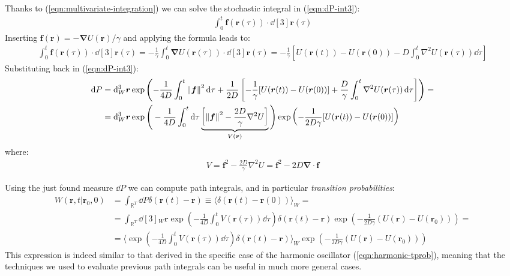 \documentclass[../template.tex]{subfiles}
\begin{document}
 Thanks to (\ref{eqn:multivariate-integration}) we can solve the stochastic integral in (\ref{eqn:dP-int3}):
 \begin{align*}
     \int_0^t \bm{f}(\bm{r}(\tau)) \cdot \dd[3]{\bm{r}(\tau)}
 \end{align*}
 Inserting $\bm{f}(\bm{r}) = -\bm{\nabla} U(\bm{r})/\gamma$ and applying the formula leads to:
 \begin{align*}
     \int_0^t \bm{f}(\bm{r}(\tau)) \cdot \dd[3]{\bm{r}(\tau)} = -\frac{1}{\gamma} \int_0^t \bm{\nabla} U(\bm{r}(\tau)) \cdot \dd[3]{\bm{r}(\tau)}  = -\frac{1}{\gamma} \left[U(\bm{r}(t)) - U(\bm{r}(0)) - D \int_0^t \nabla^2 U(\bm{r}(\tau)) \dd{\tau}\right] 
 \end{align*} 
 Substituting back in (\ref{eqn:dP-int3}):
\begin{align*}
    \dd{P} &= \dd[3]{_W \bm{r}} \exp\left(-\frac{1}{4D} \int_0^t \norm{\bm{f}}^2 \dd{\tau} + \frac{1}{2D} \left[-\frac{1}{\gamma} [U(\bm{r}(t)) - U(\bm{r}(0))] + \frac{D}{\gamma} \int_0^t \nabla^2 U(\bm{r}(\tau)) \dd{\tau} \right]  \right) =\\
    &= \dd[3]{_W \bm{r}} \exp \Bigg(-\frac{1}{4D} \int_0^t \dd{\tau} \underbrace{\left[\norm{\bm{f}}^2 - \frac{2D}{\gamma} \nabla^2 U \right]}_{V(\bm{r})}  \Bigg) \exp\left(-\frac{1}{2 D \gamma} [U(\bm{r}(t)) - U(\bm{r}(0))] \right)
\end{align*}
where:
 \begin{align*}
     V= \bm{f}^2 - \frac{2D}{\gamma}  \nabla^2 U = \bm{f}^2 - 2D \bm{\nabla} \cdot \bm{f}
 \end{align*}
 
Using the just found measure $\dd{P}$ we can compute path integrals, and in particular \textit{transition probabilities}: 
 \begin{align*}
     W(\bm{r},t | \bm{r}_0, 0) &= \int_{\mathbb{R}^T} \dd{P} \delta(\bm{r}(t) - \bm{r}) \equiv \langle \delta(\bm{r}(t)- \bm{r}(0)) \rangle_W = \\
     &= \int_{\mathbb{R}^T} \dd[3]{_W \bm{r}} \exp\left(-\frac{1}{4D} \int_0^t V(\bm{r}(\tau)) \dd{\tau} \right) \delta(\bm{r}(t) - \bm{r}) \exp\left(-\frac{1}{2D \gamma} (U(\bm{r}) - U(\bm{r}_0))\right) =\\
     &= \langle \exp\left(-\frac{1}{4D} \int_0^t V(\bm{r}(\tau)) \dd{\tau} \right)  \delta (\bm{r}(t) - \bm{r})\rangle_W \exp\left(-\frac{1}{2D \gamma} (U(\bm{r})- U(\bm{r}_0))\right)
 \end{align*}
 This expression is indeed similar to that derived in the specific case of the harmonic oscillator (\ref{eqn:harmonic-tprob}), meaning that the techniques we used to evaluate previous path integrals can be useful in much more general cases.
\end{document}
